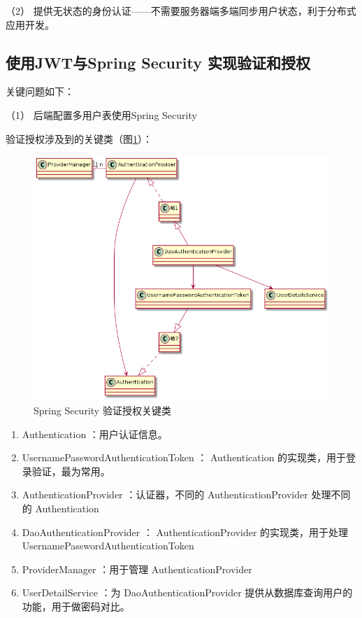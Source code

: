 （2） 提供无状态的身份认证——不需要服务器端多端同步用户状态，利于分布式应用开发。\cite{.2019h}


\subsection{使用JWT与Spring Security 实现验证和授权}

关键问题如下：

（1） 后端配置多用户表使用Spring Security

验证授权涉及到的关键类（图\ref{SpringSecurity}）：

\begin{figure}[htbp]
  \centering
  \includegraphics[scale = 0.5]{out/uml/类图/Spring Security/SpringSecurity验证/SpringSecurity验证.png}
  \caption{\song\wuhao Spring Security 验证授权关键类}
  \label{SpringSecurity}
\end{figure}

\begin{enumerate}[label=\circled{\arabic*}]
  \item  Authentication ：用户认证信息。
  \item  UsernamePasswordAuthenticationToken ： Authentication 的实现类，用于登录验证，最为常用。
  \item  AuthenticationProvider ：认证器，不同的 AuthenticationProvider  处理不同的  Authentication
  \item  DaoAuthenticationProvider ： AuthenticationProvider 的实现类，用于处理 UsernamePasswordAuthenticationToken
  \item  ProviderManager ：用于管理 AuthenticationProvider
  \item  UserDetailService ：为 DaoAuthenticationProvider 提供从数据库查询用户的功能，用于做密码对比。
\end{enumerate}

